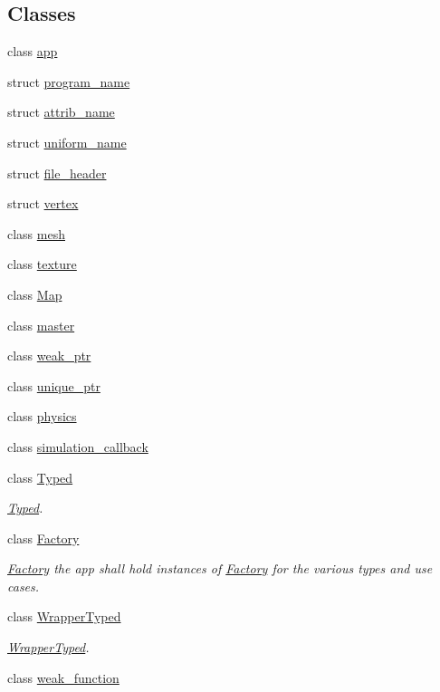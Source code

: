 \subsection*{\-Classes}
\begin{DoxyCompactItemize}
\item 
class \hyperlink{classNeb_1_1app}{app}
\item 
struct \hyperlink{structNeb_1_1program__name}{program\-\_\-name}
\item 
struct \hyperlink{structNeb_1_1attrib__name}{attrib\-\_\-name}
\item 
struct \hyperlink{structNeb_1_1uniform__name}{uniform\-\_\-name}
\item 
struct \hyperlink{structNeb_1_1file__header}{file\-\_\-header}
\item 
struct \hyperlink{structNeb_1_1vertex}{vertex}
\item 
class \hyperlink{classNeb_1_1mesh}{mesh}
\item 
class \hyperlink{classNeb_1_1texture}{texture}
\item 
class \hyperlink{classNeb_1_1Map}{\-Map}
\item 
class \hyperlink{classNeb_1_1master}{master}
\item 
class \hyperlink{classNeb_1_1weak__ptr}{weak\-\_\-ptr}
\item 
class \hyperlink{classNeb_1_1unique__ptr}{unique\-\_\-ptr}
\item 
class \hyperlink{classNeb_1_1physics}{physics}
\item 
class \hyperlink{classNeb_1_1simulation__callback}{simulation\-\_\-callback}
\item 
class \hyperlink{classNeb_1_1Typed}{\-Typed}
\begin{DoxyCompactList}\small\item\em \hyperlink{classNeb_1_1Typed}{\-Typed}. \end{DoxyCompactList}\item 
class \hyperlink{classNeb_1_1Factory}{\-Factory}
\begin{DoxyCompactList}\small\item\em \hyperlink{classNeb_1_1Factory}{\-Factory} the app shall hold instances of \hyperlink{classNeb_1_1Factory}{\-Factory} for the various types and use cases. \end{DoxyCompactList}\item 
class \hyperlink{classNeb_1_1WrapperTyped}{\-Wrapper\-Typed}
\begin{DoxyCompactList}\small\item\em \hyperlink{classNeb_1_1WrapperTyped}{\-Wrapper\-Typed}. \end{DoxyCompactList}\item 
class \hyperlink{classNeb_1_1weak__function}{weak\-\_\-function}
\end{DoxyCompactItemize}
